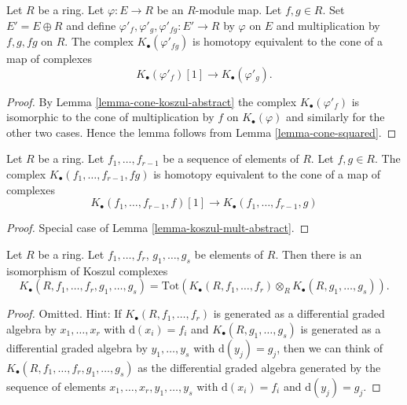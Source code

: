 \begin{lemma}
\label{lemma-koszul-mult-abstract}
Let $R$ be a ring. Let $\varphi : E \to R$ be an $R$-module map.
Let $f, g \in R$. Set $E' = E \oplus R$ and define
$\varphi'_f, \varphi'_g, \varphi'_{fg} : E' \to R$
by $\varphi$ on $E$ and multiplication by $f, g, fg$ on $R$.
The complex $K_\bullet(\varphi'_{fg})$ is homotopy equivalent to the
cone of a map of complexes
$$
K_\bullet(\varphi'_f)[1]
\longrightarrow
K_\bullet(\varphi'_g).
$$
\end{lemma}

\begin{proof}
By
Lemma \ref{lemma-cone-koszul-abstract}
the complex $K_\bullet(\varphi'_f)$ is isomorphic to the cone of
multiplication by $f$ on $K_\bullet(\varphi)$ and similarly
for the other two cases. Hence the lemma follows from
Lemma \ref{lemma-cone-squared}.
\end{proof}

\begin{lemma}
\label{lemma-koszul-mult}
Let $R$ be a ring. Let $f_1, \ldots, f_{r - 1}$ be a sequence of elements
of $R$. Let $f, g \in R$. The complex
$K_\bullet(f_1, \ldots, f_{r - 1}, fg)$
is homotopy equivalent to the cone of a map of complexes
$$
K_\bullet(f_1, \ldots, f_{r - 1}, f)[1]
\longrightarrow
K_\bullet(f_1, \ldots, f_{r - 1}, g)
$$
\end{lemma}

\begin{proof}
Special case of
Lemma \ref{lemma-koszul-mult-abstract}.
\end{proof}

\begin{lemma}
\label{lemma-join-sequences-koszul-complex}
Let $R$ be a ring.
Let $f_1, \ldots, f_r$, $g_1, \ldots, g_s$ be elements of $R$.
Then there is an isomorphism of Koszul complexes
$$
K_\bullet(R, f_1, \ldots, f_r, g_1, \ldots, g_s) =
\text{Tot}(K_\bullet(R, f_1, \ldots, f_r) \otimes_R
K_\bullet(R, g_1, \ldots, g_s)).
$$
\end{lemma}

\begin{proof}
Omitted. Hint: If $K_\bullet(R, f_1, \ldots, f_r)$ is generated as a
differential graded algebra by $x_1, \ldots, x_r$ with $\text{d}(x_i) = f_i$
and $K_\bullet(R, g_1, \ldots, g_s)$ is generated as a
differential graded algebra by $y_1, \ldots, y_s$ with $\text{d}(y_j) = g_j$,
then we can think of $K_\bullet(R, f_1, \ldots, f_r, g_1, \ldots, g_s)$
as the differential graded algebra generated by the sequence of elements
$x_1, \ldots, x_r, y_1, \ldots, y_s$ with $\text{d}(x_i) = f_i$
and $\text{d}(y_j) = g_j$.
\end{proof}





